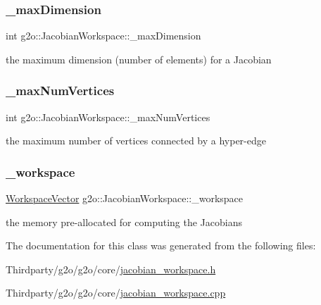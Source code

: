 \subsubsection{\texorpdfstring{\+\_\+max\+Dimension}{\_maxDimension}}
{\footnotesize\ttfamily int g2o\+::\+Jacobian\+Workspace\+::\+\_\+max\+Dimension\hspace{0.3cm}{\ttfamily [protected]}}



the maximum dimension (number of elements) for a Jacobian 

\mbox{\label{classg2o_1_1_jacobian_workspace_a640c84c19a739ce3116fc02c3a66b096}} 
\subsubsection{\texorpdfstring{\+\_\+max\+Num\+Vertices}{\_maxNumVertices}}
{\footnotesize\ttfamily int g2o\+::\+Jacobian\+Workspace\+::\+\_\+max\+Num\+Vertices\hspace{0.3cm}{\ttfamily [protected]}}



the maximum number of vertices connected by a hyper-\/edge 

\mbox{\label{classg2o_1_1_jacobian_workspace_af7dbaa3a651808e1bf3f876896bd1bfc}} 
\subsubsection{\texorpdfstring{\+\_\+workspace}{\_workspace}}
{\footnotesize\ttfamily \mbox{\hyperlink{classg2o_1_1_jacobian_workspace_aee9d767fa1208772a3de83732646e182}{Workspace\+Vector}} g2o\+::\+Jacobian\+Workspace\+::\+\_\+workspace\hspace{0.3cm}{\ttfamily [protected]}}



the memory pre-\/allocated for computing the Jacobians 



The documentation for this class was generated from the following files\+:\begin{DoxyCompactItemize}
\item 
Thirdparty/g2o/g2o/core/\mbox{\hyperlink{jacobian__workspace_8h}{jacobian\+\_\+workspace.\+h}}\item 
Thirdparty/g2o/g2o/core/\mbox{\hyperlink{jacobian__workspace_8cpp}{jacobian\+\_\+workspace.\+cpp}}\end{DoxyCompactItemize}
